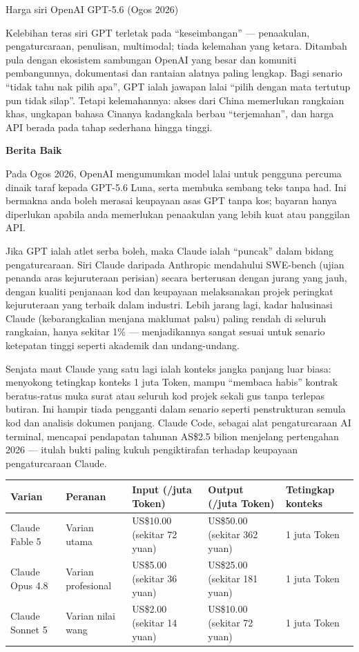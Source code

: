 \begin{center}\small\color{gray}Harga siri OpenAI GPT-5.6 (Ogos 2026)\end{center}

Kelebihan teras siri GPT terletak pada “keseimbangan” — penaakulan, pengaturcaraan, penulisan, multimodal; tiada kelemahan yang ketara. Ditambah pula dengan ekosistem sambungan OpenAI yang besar dan komuniti pembangunnya, dokumentasi dan rantaian alatnya paling lengkap. Bagi senario “tidak tahu nak pilih apa”, GPT ialah jawapan lalai “pilih dengan mata tertutup pun tidak silap”. Tetapi kelemahannya: akses dari China memerlukan rangkaian khas, ungkapan bahasa Cinanya kadangkala berbau “terjemahan”, dan harga API berada pada tahap sederhana hingga tinggi.

\textbf{Berita Baik}\par

Pada Ogos 2026, OpenAI mengumumkan model lalai untuk pengguna percuma dinaik taraf kepada GPT-5.6 Luna, serta membuka sembang teks tanpa had. Ini bermakna anda boleh merasai keupayaan asas GPT tanpa kos; bayaran hanya diperlukan apabila anda memerlukan penaakulan yang lebih kuat atau panggilan API.


Jika GPT ialah atlet serba boleh, maka Claude ialah “puncak” dalam bidang pengaturcaraan. Siri Claude daripada Anthropic mendahului SWE-bench (ujian penanda aras kejuruteraan perisian) secara berterusan dengan jurang yang jauh, dengan kualiti penjanaan kod dan keupayaan melaksanakan projek peringkat kejuruteraan yang terbaik dalam industri. Lebih jarang lagi, kadar halusinasi Claude (kebarangkalian menjana maklumat palsu) paling rendah di seluruh rangkaian, hanya sekitar 1\% — menjadikannya sangat sesuai untuk senario ketepatan tinggi seperti akademik dan undang-undang.

Senjata maut Claude yang satu lagi ialah konteks jangka panjang luar biasa: menyokong tetingkap konteks 1 juta Token, mampu “membaca habis” kontrak beratus-ratus muka surat atau seluruh kod projek sekali gus tanpa terlepas butiran. Ini hampir tiada pengganti dalam senario seperti penstrukturan semula kod dan analisis dokumen panjang. Claude Code, sebagai alat pengaturcaraan AI terminal, mencapai pendapatan tahunan AS\$2.5 bilion menjelang pertengahan 2026 — itulah bukti paling kukuh pengiktirafan terhadap keupayaan pengaturcaraan Claude.

\begin{center}
\begin{tabularx}{\linewidth}{|X|X|X|X|X|}
\hline
\textbf{Varian} & \textbf{Peranan} & \textbf{Input (/juta Token)} & \textbf{Output (/juta Token)} & \textbf{Tetingkap konteks} \tabularnewline
\hline
Claude Fable 5 & Varian utama & US\$10.00 (sekitar 72 yuan) & US\$50.00 (sekitar 362 yuan) & 1 juta Token \tabularnewline
Claude Opus 4.8 & Varian profesional & US\$5.00 (sekitar 36 yuan) & US\$25.00 (sekitar 181 yuan) & 1 juta Token \tabularnewline
Claude Sonnet 5 & Varian nilai wang & US\$2.00 (sekitar 14 yuan) & US\$10.00 (sekitar 72 yuan) & 1 juta Token \tabularnewline
\hline
\end{tabularx}
\end{center}

